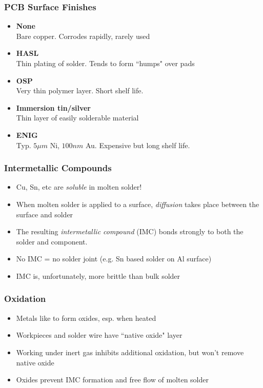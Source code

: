 \documentclass{beamer}
\begin{document}
\begin{frame}
\frametitle{PCB Surface Finishes}
\begin{itemize}
\item \textbf{None}\\
Bare copper. Corrodes rapidly, rarely used
\item \textbf{HASL} \\
Thin plating of solder. Tends to form ``humps" over pads
\item \textbf{OSP} \\
Very thin polymer layer. Short shelf life.
\item \textbf{Immersion tin/silver} \\
Thin layer of easily solderable material
\item \textbf{ENIG} \\
Typ. $5 \mu m$ Ni, $100 nm$ Au. Expensive but long shelf life.
\end{itemize}
\end{frame}

\begin{frame}
\frametitle{Intermetallic Compounds}
\begin{itemize}
\item Cu, Sn, etc are \emph{soluble} in molten solder!
\item When molten solder is applied to a surface, \emph{diffusion} takes place between the surface and solder
\item The resulting \emph{intermetallic compound} (IMC) bonds strongly to both the solder and component.
\item No IMC = no solder joint (e.g. Sn based solder on Al surface)
\item IMC is, unfortunately, more brittle than bulk solder
\end{itemize}
\end{frame}

\begin{frame}
\frametitle{Oxidation}
\begin{itemize}
\item Metals like to form oxides, esp. when heated
\item Workpieces and solder wire have ``native oxide" layer
\item Working under inert gas inhibits additional oxidation, but won't remove native oxide
\item Oxides prevent IMC formation and free flow of molten solder
\end{itemize}
\end{frame}
\end{document}
